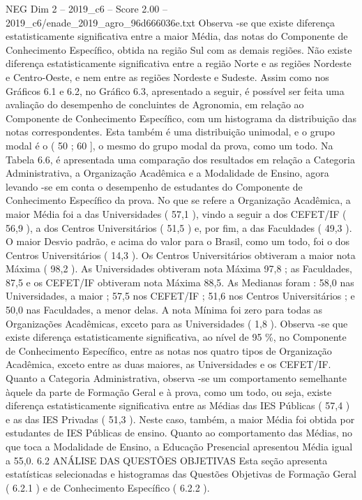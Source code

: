 \begin{textsample}{NEG Dim 2 – 2019\_c6 – Score 2.00 – 2019\_c6/enade\_2019\_agro\_96d666036e.txt}
Observa -se que existe diferença estatisticamente significativa entre a maior Média, das notas do Componente de Conhecimento Específico, obtida na região Sul com as demais regiões.
Não existe diferença estatisticamente significativa entre a região Norte e as regiões Nordeste e Centro-Oeste, e nem entre as regiões Nordeste e Sudeste.
Assim como nos Gráficos 6.1 e 6.2, no Gráfico 6.3, apresentado a seguir, é possível ser feita uma avaliação do desempenho de concluintes de Agronomia, em relação ao Componente de Conhecimento Específico, com um histograma da distribuição das notas correspondentes.
Esta também é uma distribuição unimodal, e o grupo modal é o ( 50 ; 60 ], o mesmo do grupo modal da prova, como um todo.
Na Tabela 6.6, é apresentada uma comparação dos resultados em relação a Categoria Administrativa, a Organização Acadêmica e a Modalidade de Ensino, agora levando -se em conta o desempenho de estudantes do Componente de Conhecimento Específico da prova.
No que se refere a Organização Acadêmica, a maior Média foi a das Universidades ( 57,1 ), vindo a seguir a dos CEFET/IF ( 56,9 ), a dos Centros Universitários ( 51,5 ) e, por fim, a das Faculdades ( 49,3 ).
O maior Desvio padrão, e acima do valor para o Brasil, como um todo, foi o dos Centros Universitários ( 14,3 ).
Os Centros Universitários obtiveram a maior nota Máxima ( 98,2 ).
As Universidades obtiveram nota Máxima 97,8 ; as Faculdades, 87,5 e os CEFET/IF obtiveram nota Máxima 88,5.
As Medianas foram : 58,0 nas Universidades, a maior ; 57,5 nos CEFET/IF ; 51,6 nos Centros Universitários ; e 50,0 nas Faculdades, a menor delas.
A nota Mínima foi zero para todas as Organizações Acadêmicas, exceto para as Universidades ( 1,8 ).
Observa -se que existe diferença estatisticamente significativa, ao nível de 95 \%, no Componente de Conhecimento Específico, entre as notas nos quatro tipos de Organização Acadêmica, exceto entre as duas maiores, as Universidades e os CEFET/IF.
Quanto a Categoria Administrativa, observa -se um comportamento semelhante àquele da parte de Formação Geral e à prova, como um todo, ou seja, existe diferença estatisticamente significativa entre as Médias das IES Públicas ( 57,4 ) e as das IES Privadas ( 51,3 ).
Neste caso, também, a maior Média foi obtida por estudantes de IES Públicas de ensino.
Quanto ao comportamento das Médias, no que toca a Modalidade de Ensino, a Educação Presencial apresentou Média igual a 55,0. 6.2 ANÁLISE DAS QUESTÕES OBJETIVAS Esta seção apresenta estatísticas selecionadas e histogramas das Questões Objetivas de Formação Geral ( 6.2.1 ) e de Conhecimento Específico ( 6.2.2 ).

\end{textsample}

